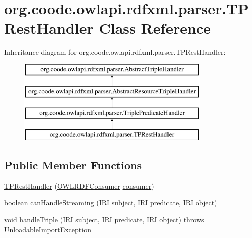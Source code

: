 \hypertarget{classorg_1_1coode_1_1owlapi_1_1rdfxml_1_1parser_1_1_t_p_rest_handler}{\section{org.\-coode.\-owlapi.\-rdfxml.\-parser.\-T\-P\-Rest\-Handler Class Reference}
\label{classorg_1_1coode_1_1owlapi_1_1rdfxml_1_1parser_1_1_t_p_rest_handler}
}
Inheritance diagram for org.\-coode.\-owlapi.\-rdfxml.\-parser.\-T\-P\-Rest\-Handler\-:\begin{figure}[H]
\begin{center}
\leavevmode
\includegraphics[height=4.000000cm]{classorg_1_1coode_1_1owlapi_1_1rdfxml_1_1parser_1_1_t_p_rest_handler}
\end{center}
\end{figure}
\subsection*{Public Member Functions}
\begin{DoxyCompactItemize}
\item 
\hyperlink{classorg_1_1coode_1_1owlapi_1_1rdfxml_1_1parser_1_1_t_p_rest_handler_a48a202ccf933b247376b708dbdfa0917}{T\-P\-Rest\-Handler} (\hyperlink{classorg_1_1coode_1_1owlapi_1_1rdfxml_1_1parser_1_1_o_w_l_r_d_f_consumer}{O\-W\-L\-R\-D\-F\-Consumer} \hyperlink{classorg_1_1coode_1_1owlapi_1_1rdfxml_1_1parser_1_1_abstract_triple_handler_a4ccf4d898ff01eb1cadfa04b23d54e9c}{consumer})
\item 
boolean \hyperlink{classorg_1_1coode_1_1owlapi_1_1rdfxml_1_1parser_1_1_t_p_rest_handler_ad06c9e9e87be576d4d7d034749654ce2}{can\-Handle\-Streaming} (\hyperlink{classorg_1_1semanticweb_1_1owlapi_1_1model_1_1_i_r_i}{I\-R\-I} subject, \hyperlink{classorg_1_1semanticweb_1_1owlapi_1_1model_1_1_i_r_i}{I\-R\-I} predicate, \hyperlink{classorg_1_1semanticweb_1_1owlapi_1_1model_1_1_i_r_i}{I\-R\-I} object)
\item 
void \hyperlink{classorg_1_1coode_1_1owlapi_1_1rdfxml_1_1parser_1_1_t_p_rest_handler_a2ad85e8df4014c1d061868a1a343fd51}{handle\-Triple} (\hyperlink{classorg_1_1semanticweb_1_1owlapi_1_1model_1_1_i_r_i}{I\-R\-I} subject, \hyperlink{classorg_1_1semanticweb_1_1owlapi_1_1model_1_1_i_r_i}{I\-R\-I} predicate, \hyperlink{classorg_1_1semanticweb_1_1owlapi_1_1model_1_1_i_r_i}{I\-R\-I} object)  throws Unloadable\-Import\-Exception 
\end{DoxyCompactItemize}
